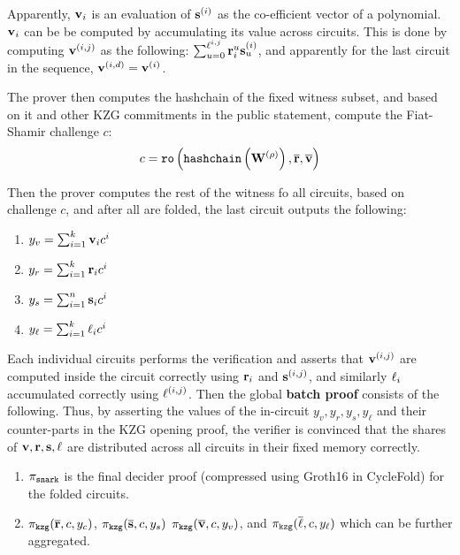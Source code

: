 Apparently, ${{\mathbf {v}}}_i$ is an evaluation of ${{\mathbf {s}}}^{(i)}$
as the co-efficient vector of a polynomial.
${{\mathbf {v}}}_i$ can be be computed by accumulating its value
across circuits. This is done by computing
${{\mathbf {v}}}^{(i,j)}$ as the following:
$\sum_{u=0}^{\ell^{i,j}} {{{\mathbf {r}}}}_i^u {{{\mathbf {s}}}}^{(i)}_u$,
and apparently for the last circuit in the sequence,
${{\mathbf {v}}}^{(i,d)} = {{\mathbf {v}}}^{(i)}$.

 The prover then computes the hashchain of the fixed witness subset,
 and based on it and other KZG commitments in the public statement,
 compute the Fiat-Shamir challenge $c$:
 \[
 	c = \texttt{ro}\left(
 		\texttt{hashchain}\left({{\mathbf {W}}}^{(\rho)}\right), 
 			\overline{{{\mathbf {r}}}}, \overline{{{\mathbf {v}}}}
 	\right)
 \]

Then the prover computes the rest of the witness fo all circuits,
based on challenge $c$, and after all are folded, the last circuit
outputs the following:
\begin{enumerate}
	\item $y_v = \sum_{i=1}^k {{\mathbf {v}}}_i c^i$
	\item $y_r = \sum_{i=1}^k {{\mathbf {r}}}_i c^i$
	\item $y_s = \sum_{i=1}^n {{\mathbf {s}}}_i c^i$
	\item $y_\ell = \sum_{i=1}^k {{\mathbf {\ell}}}_i c^i$
\end{enumerate}

Each individual circuits performs the verification and asserts that
${{\mathbf {v}}}^{(i,j)}$ are computed inside the circuit correctly
using ${{\mathbf {r}}}_i$ and ${{\mathbf {s}}}^{(i,j)}$, and similarly
${{\mathbf {\ell}}}_i$ accumulated correctly using ${{\mathbf {\ell}}}^{(i,j)}$.
Then the global {\bf batch proof} consists of the following.
Thus, by asserting the values of
the in-circuit $y_v, y_r, y_s, y_\ell$ and their counter-parts
in the KZG opening proof, the verifier is convinced
that the shares of ${{\mathbf {v}}}, {{\mathbf {r}}}, {{\mathbf {s}}}, {{\mathbf {\ell}}}$
are distributed across all circuits in their fixed memory correctly.

\begin{enumerate}
\item $\pi_{\texttt{snark}}$ is the final decider proof (compressed
	using Groth16 \cite{Groth16} in CycleFold) for the folded circuits.
\item 
$\pi_{\texttt{kzg}}(\overline{{{\mathbf {r}}}}, c, y_c)$,
$\pi_{\texttt{kzg}}(\overline{{{\mathbf {s}}}}, c, y_s)$
$\pi_{\texttt{kzg}}(\overline{{{\mathbf {v}}}}, c, y_v)$, and
$\pi_{\texttt{kzg}}(\overline{{{\mathbf {\ell}}}}, c, y_\ell)$
which can be further aggregated.
\end{enumerate}


